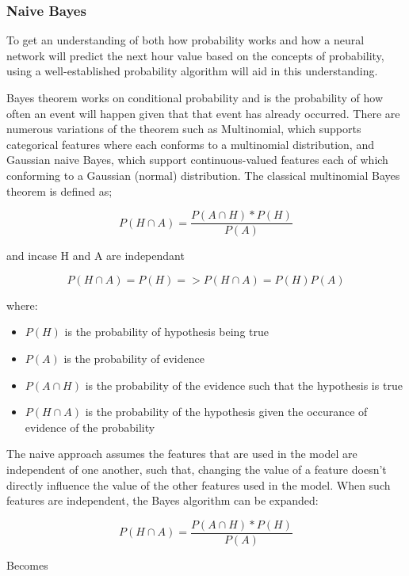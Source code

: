 \documentclass[oneside, 12pt]{article}
\begin{document}
			\subsubsection{Naive Bayes}
			To get an understanding of both how probability works and how a neural network will predict the next hour value based on the concepts of probability, using a well-established probability algorithm will aid in this understanding.
			
			Bayes theorem works on conditional probability and is the probability of how often an event will happen given that that event has already occurred. There are numerous variations of the theorem such as Multinomial, which supports categorical features where each conforms to a multinomial distribution, and Gaussian naive Bayes, which support continuous-valued features each of which conforming to a Gaussian (normal) distribution. The classical multinomial Bayes theorem is defined as; \cite{StudyNBC}
			
			\[P(H\cap A) = \frac{P(A\cap H) * P(H)}{P(A)} \] 
			
			\begin{center}
				and incase H and A are independant
			\end{center}
		
			\[P(H\cap A) = P(H) => P(H\cap A) = P(H)P(A)\]
			
			where:
			\begin{itemize}
				\item $P(H)$ is the probability of hypothesis being true
				\item $P(A)$ is the probability of evidence
				\item $P(A\cap H)$ is the probability of the evidence such that the hypothesis is true
				\item $P(H\cap A)$ is the probability of the hypothesis given the occurance of evidence of the probability
			\end{itemize}
		
			The naive approach assumes the features that are used in the model are independent of one another, such that, changing the value of a feature doesn't directly influence the value of the other features used in the model. When such features are independent, the Bayes algorithm can be expanded:
			
			\[P(H\cap A) = \frac{P(A\cap H) * P(H)}{P(A)} \]
			
			\begin{center}
				Becomes
			\end{center}
			
\end{document}
